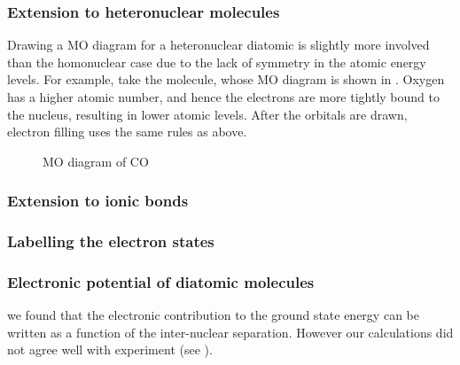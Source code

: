 
\subsubsection{Extension to heteronuclear molecules}


Drawing a MO diagram for a heteronuclear diatomic is slightly more involved than
the homonuclear case due to the lack of symmetry in the atomic energy levels.
For example, take the  molecule, whose MO diagram is shown in
. Oxygen has a higher atomic number, and hence the
electrons are more tightly bound to the nucleus, resulting in lower atomic
levels. After the orbitals are drawn, electron filling uses the same rules as
above.

\begin{figure}
  \caption{MO diagram of CO}
  \label{diaspec:fig:CO}
\end{figure}



\subsubsection{Extension to ionic bonds}

\subsubsection{Labelling the electron states}


\subsubsection{Electronic potential of diatomic molecules}

 we found that the electronic contribution to the ground state energy
can be written as a function of the inter-nuclear separation. However our
calculations did not agree well with experiment (see
).

